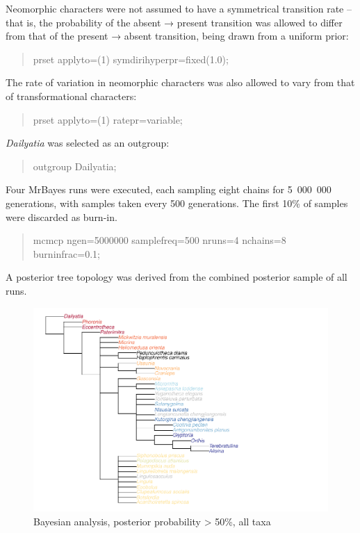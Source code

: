\documentclass[]{book}
\theoremstyle{definition}
\theoremstyle{definition}
\theoremstyle{definition}
\theoremstyle{remark}
\begin{document}
Neomorphic characters were not assumed to have a symmetrical transition
rate -- that is, the probability of the absent → present transition was
allowed to differ from that of the present → absent transition, being
drawn from a uniform prior:

\begin{quote}
prset applyto=(1) symdirihyperpr=fixed(1.0);
\end{quote}

The rate of variation in neomorphic characters was also allowed to vary
from that of transformational characters:

\begin{quote}
prset applyto=(1) ratepr=variable;
\end{quote}

\emph{Dailyatia} was selected as an outgroup:

\begin{quote}
outgroup Dailyatia;
\end{quote}

Four MrBayes runs were executed, each sampling eight chains for
5~000~000 generations, with samples taken every 500 generations. The
first 10\% of samples were discarded as burn-in.

\begin{quote}
mcmcp ngen=5000000 samplefreq=500 nruns=4 nchains=8 burninfrac=0.1;
\end{quote}

A posterior tree topology was derived from the combined posterior sample
of all runs.

\begin{figure}
\centering
\includegraphics{Brachiopod_phylogeny_files/figure-latex/mrbayes-full-consensus-1.pdf}
\caption{\label{fig:mrbayes-full-consensus}Bayesian analysis, posterior
probability \textgreater{} 50\%, all taxa}
\end{figure}
\end{document}
